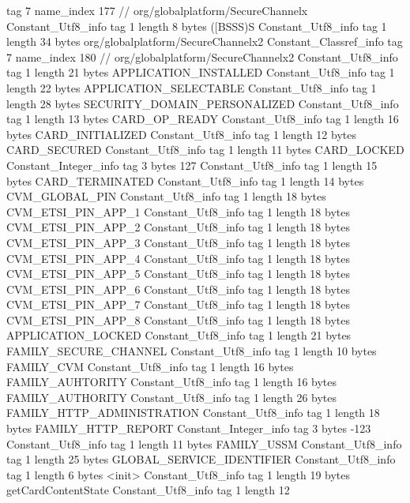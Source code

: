 {{{			tag	7
			name_index	177		// org/globalplatform/SecureChannelx
		}
		Constant_Utf8_info {
			tag	1
			length	8
			bytes	([BSSS)S
		}
		Constant_Utf8_info {
			tag	1
			length	34
			bytes	org/globalplatform/SecureChannelx2
		}
		Constant_Classref_info {
			tag	7
			name_index	180		// org/globalplatform/SecureChannelx2
		}
		Constant_Utf8_info {
			tag	1
			length	21
			bytes	APPLICATION_INSTALLED
		}
		Constant_Utf8_info {
			tag	1
			length	22
			bytes	APPLICATION_SELECTABLE
		}
		Constant_Utf8_info {
			tag	1
			length	28
			bytes	SECURITY_DOMAIN_PERSONALIZED
		}
		Constant_Utf8_info {
			tag	1
			length	13
			bytes	CARD_OP_READY
		}
		Constant_Utf8_info {
			tag	1
			length	16
			bytes	CARD_INITIALIZED
		}
		Constant_Utf8_info {
			tag	1
			length	12
			bytes	CARD_SECURED
		}
		Constant_Utf8_info {
			tag	1
			length	11
			bytes	CARD_LOCKED
		}
		Constant_Integer_info {
			tag	3
			bytes	127
		}
		Constant_Utf8_info {
			tag	1
			length	15
			bytes	CARD_TERMINATED
		}
		Constant_Utf8_info {
			tag	1
			length	14
			bytes	CVM_GLOBAL_PIN
		}
		Constant_Utf8_info {
			tag	1
			length	18
			bytes	CVM_ETSI_PIN_APP_1
		}
		Constant_Utf8_info {
			tag	1
			length	18
			bytes	CVM_ETSI_PIN_APP_2
		}
		Constant_Utf8_info {
			tag	1
			length	18
			bytes	CVM_ETSI_PIN_APP_3
		}
		Constant_Utf8_info {
			tag	1
			length	18
			bytes	CVM_ETSI_PIN_APP_4
		}
		Constant_Utf8_info {
			tag	1
			length	18
			bytes	CVM_ETSI_PIN_APP_5
		}
		Constant_Utf8_info {
			tag	1
			length	18
			bytes	CVM_ETSI_PIN_APP_6
		}
		Constant_Utf8_info {
			tag	1
			length	18
			bytes	CVM_ETSI_PIN_APP_7
		}
		Constant_Utf8_info {
			tag	1
			length	18
			bytes	CVM_ETSI_PIN_APP_8
		}
		Constant_Utf8_info {
			tag	1
			length	18
			bytes	APPLICATION_LOCKED
		}
		Constant_Utf8_info {
			tag	1
			length	21
			bytes	FAMILY_SECURE_CHANNEL
		}
		Constant_Utf8_info {
			tag	1
			length	10
			bytes	FAMILY_CVM
		}
		Constant_Utf8_info {
			tag	1
			length	16
			bytes	FAMILY_AUHTORITY
		}
		Constant_Utf8_info {
			tag	1
			length	16
			bytes	FAMILY_AUTHORITY
		}
		Constant_Utf8_info {
			tag	1
			length	26
			bytes	FAMILY_HTTP_ADMINISTRATION
		}
		Constant_Utf8_info {
			tag	1
			length	18
			bytes	FAMILY_HTTP_REPORT
		}
		Constant_Integer_info {
			tag	3
			bytes	-123
		}
		Constant_Utf8_info {
			tag	1
			length	11
			bytes	FAMILY_USSM
		}
		Constant_Utf8_info {
			tag	1
			length	25
			bytes	GLOBAL_SERVICE_IDENTIFIER
		}
		Constant_Utf8_info {
			tag	1
			length	6
			bytes	<init>
		}
		Constant_Utf8_info {
			tag	1
			length	19
			bytes	getCardContentState
		}
		Constant_Utf8_info {
			tag	1
			length	12
}}}
